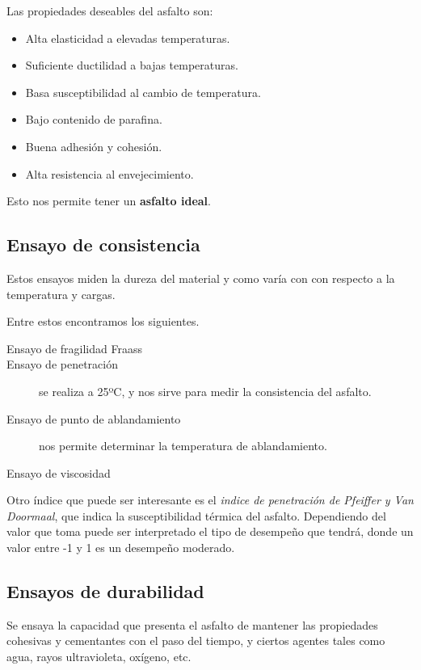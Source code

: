 \documentclass[../main.tex]{subfiles}
\begin{document}
Las propiedades deseables del asfalto son:

\begin{itemize}
  \item Alta elasticidad a elevadas temperaturas.
  \item Suficiente ductilidad a bajas temperaturas.
  \item Basa susceptibilidad al cambio de temperatura.
  \item Bajo contenido de parafina.
  \item Buena adhesión y cohesión.
  \item Alta resistencia al envejecimiento.
\end{itemize}

Esto nos permite tener un \textbf{asfalto ideal}.

\subsection{Ensayo de consistencia}

Estos ensayos miden la dureza del material y como varía con con respecto
a la temperatura y cargas.

Entre estos encontramos los siguientes.

\begin{description}
  \item[Ensayo de fragilidad Fraass] 
  \item[Ensayo de penetración] se realiza a 25ºC, y nos sirve para medir la
    consistencia del asfalto.
  \item[Ensayo de punto de ablandamiento] nos permite determinar la temperatura
    de ablandamiento.
  \item[Ensayo de viscosidad] 
\end{description}

Otro índice que puede ser interesante es el \textit{indice de penetración de
Pfeiffer y Van Doormaal}, que indica la susceptibilidad térmica del asfalto.
Dependiendo del valor que toma puede ser interpretado el tipo de desempeño
que tendrá, donde un valor entre -1 y 1 es un desempeño moderado.

\subsection{Ensayos de durabilidad}

Se ensaya la capacidad que presenta el asfalto de mantener las propiedades
cohesivas y cementantes con el paso del tiempo, y ciertos agentes tales como
agua, rayos ultravioleta, oxígeno, etc. 
\end{document}

